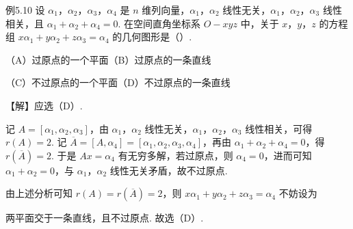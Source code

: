 \begin{fcard}{例5.10}
设 $\alpha_1$，$\alpha_2$，$\alpha_3$，$\alpha_4$ 是 $n$ 维列向量，$\alpha_1$，$\alpha_2$ 线性无关，$\alpha_1$，$\alpha_2$，$\alpha_3$ 线性相关，且 $\alpha_1+\alpha_2+\alpha_4=0$. 在空间直角坐标系 $O-xyz$ 中，关于 $x$，$y$，$z$ 的方程组 $x\alpha_1+y\alpha_2+z\alpha_3=\alpha_4$ 的几何图形是（\quad）.

（A）过原点的一个平面\qquad（B）过原点的一条直线

（C）不过原点的一个平面\qquad（D）不过原点的一条直线


【解】应选（D）.

记 $A=[\alpha_1,\alpha_2,\alpha_3]$，由 $\alpha_1$，$\alpha_2$ 线性无关，$\alpha_1$，$\alpha_2$，$\alpha_3$ 线性相关，可得 $r(A)=2$. 记 $\overline{A}=[A,\alpha_4]=[\alpha_1,\alpha_2,\alpha_3,\alpha_4]$，再由 $\alpha_1+\alpha_2+\alpha_4=0$，得 $r(\overline{A})=2$. 于是 $Ax=\alpha_4$ 有无穷多解，若过原点，则 $\alpha_4=0$，进而可知 $\alpha_1+\alpha_2=0$，与 $\alpha_1$，$\alpha_2$ 线性无关矛盾，故不过原点.

由上述分析可知 $r(A)=r(\overline{A})=2$，则 $x\alpha_1+y\alpha_2+z\alpha_3=\alpha_4$ 不妨设为


两平面交于一条直线，且不过原点. 故选（D）.
\end{fcard}

